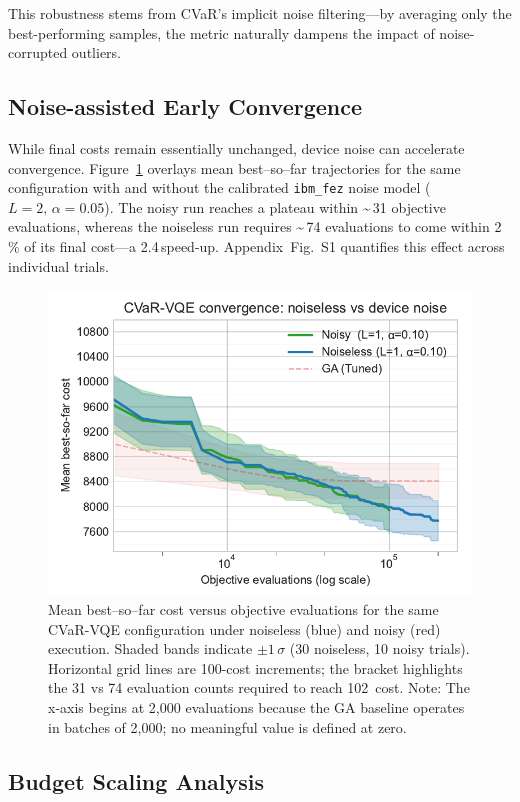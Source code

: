 This robustness stems from CVaR's implicit noise filtering—by averaging only 
the best-performing samples, the metric naturally dampens the impact of 
noise-corrupted outliers.

\subsection{Noise-assisted Early Convergence}

While final costs remain essentially unchanged, device noise can 
accelerate convergence. Figure~\ref{fig:learning_curves_noise} overlays 
mean best–so–far trajectories for the same configuration with and without 
the calibrated \texttt{ibm\_fez} noise model (\(L=2,\,\alpha=0.05\)). The 
noisy run reaches a plateau within \textasciitilde{}\,31 objective evaluations, whereas the noiseless 
run requires \textasciitilde{}\,74 evaluations to come within 2\,\% of its final cost—a 
2.4\,\times speed-up. Appendix~Fig.~S1 quantifies this effect across individual 
trials.

\begin{figure}[h]
  \centering
  \includegraphics[width=.7\linewidth]{fig/learning_curves_noise.pdf}
  \caption{Mean best–so–far cost versus objective evaluations for the same
           CVaR-VQE configuration under noiseless (blue) and noisy (red) execution.
           Shaded bands indicate $\pm1\,\sigma$ (30 noiseless, 10 noisy trials).
           Horizontal grid lines are 100-cost increments; the bracket highlights
           the 31 vs 74 evaluation counts required to reach 102\,%
           cost. Note: The x-axis begins at 2,000 evaluations because the GA baseline operates in batches of 2,000; no meaningful value is defined at zero.}
  \label{fig:learning_curves_noise}
\end{figure}

\subsection{Budget Scaling Analysis}

